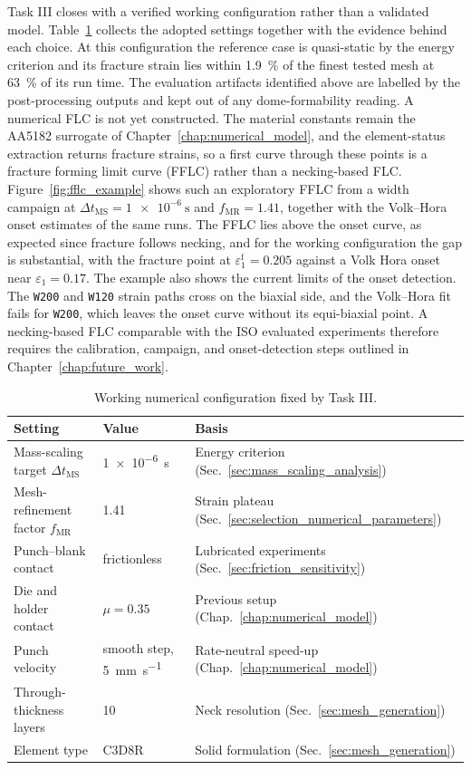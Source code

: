 Task III closes with a verified working configuration rather than a validated
model. Table~\ref{tab:working_configuration} collects the adopted settings
together with the evidence behind each choice. At this configuration the
reference case is quasi-static by the energy criterion and its fracture
strain lies within \SI{1.9}{\percent} of the finest tested mesh at
\SI{63}{\percent} of its run time. The evaluation artifacts identified above
are labelled by the post-processing outputs and kept out of any
dome-formability reading. A numerical FLC is not yet constructed. The material constants remain the
AA5182 surrogate of Chapter~\ref{chap:numerical_model}, and the
element-status extraction returns fracture strains, so a first curve through
these points is a fracture forming limit curve (FFLC) rather than a
necking-based FLC. Figure~\ref{fig:fflc_example} shows such an exploratory
FFLC from a width campaign at $\Delta t_\mathrm{MS}=\SI{1e-6}{\second}$ and
$f_\mathrm{MR}=1.41$, together with the Volk--Hora onset estimates of the same
runs. The FFLC lies above the onset curve, as expected since fracture
follows necking, and for the working configuration the gap is substantial,
with the fracture point at $\varepsilon_1^\mathrm{f}=0.205$ against a Volk
Hora onset near $\varepsilon_1=0.17$. The example also shows the current
limits of the onset detection. The \texttt{W200} and \texttt{W120} strain
paths cross on the biaxial side, and the Volk--Hora fit fails for
\texttt{W200}, which leaves the onset curve without its equi-biaxial point.
A necking-based FLC comparable with the ISO evaluated experiments therefore
requires the calibration, campaign, and onset-detection steps outlined in
Chapter~\ref{chap:future_work}.

\begin{table}[H]
    \centering
    \small
    \begin{tabular}{l l l}
        \toprule
        Setting & Value & Basis \\
        \midrule
        Mass-scaling target $\Delta t_\mathrm{MS}$ & \SI{1e-6}{\second} & Energy criterion (Sec.~\ref{sec:mass_scaling_analysis}) \\
        Mesh-refinement factor $f_\mathrm{MR}$ & 1.41 & Strain plateau (Sec.~\ref{sec:selection_numerical_parameters}) \\
        Punch--blank contact & frictionless & Lubricated experiments (Sec.~\ref{sec:friction_sensitivity}) \\
        Die and holder contact & $\mu=0.35$ & Previous setup (Chap.~\ref{chap:numerical_model}) \\
        Punch velocity & smooth step, \SI{5}{\milli\meter\per\second} & Rate-neutral speed-up (Chap.~\ref{chap:numerical_model}) \\
        Through-thickness layers & 10 & Neck resolution (Sec.~\ref{sec:mesh_generation}) \\
        Element type & C3D8R & Solid formulation (Sec.~\ref{sec:mesh_generation}) \\
        \bottomrule
    \end{tabular}
    \caption{Working numerical configuration fixed by Task III.}
    \label{tab:working_configuration}
\end{table}

